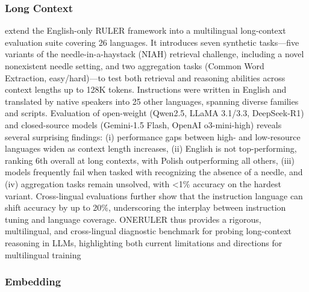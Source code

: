 \documentclass[acmsmall]{acmart}
\begin{document}
\subsubsection{Long Context}
\citep{kim2025rulermeasureallbenchmarking} extend the English-only RULER framework into a multilingual long-context evaluation suite covering 26 languages. It introduces seven synthetic tasks—five variants of the needle-in-a-haystack (NIAH) retrieval challenge, including a novel nonexistent needle setting, and two aggregation tasks (Common Word Extraction, easy/hard)—to test both retrieval and reasoning abilities across context lengths up to 128K tokens. Instructions were written in English and translated by native speakers into 25 other languages, spanning diverse families and scripts. Evaluation of open-weight (Qwen2.5, LLaMA 3.1/3.3, DeepSeek-R1) and closed-source models (Gemini-1.5 Flash, OpenAI o3-mini-high) reveals several surprising findings: (i) performance gaps between high- and low-resource languages widen as context length increases, (ii) English is not top-performing, ranking 6th overall at long contexts, with Polish outperforming all others, (iii) models frequently fail when tasked with recognizing the absence of a needle, and (iv) aggregation tasks remain unsolved, with <1\% accuracy on the hardest variant. Cross-lingual evaluations further show that the instruction language can shift accuracy by up to 20\%, underscoring the interplay between instruction tuning and language coverage. ONERULER thus provides a rigorous, multilingual, and cross-lingual diagnostic benchmark for probing long-context reasoning in LLMs, highlighting both current limitations and directions for multilingual training

\subsubsection{Embedding}
\noindent
\end{document}
